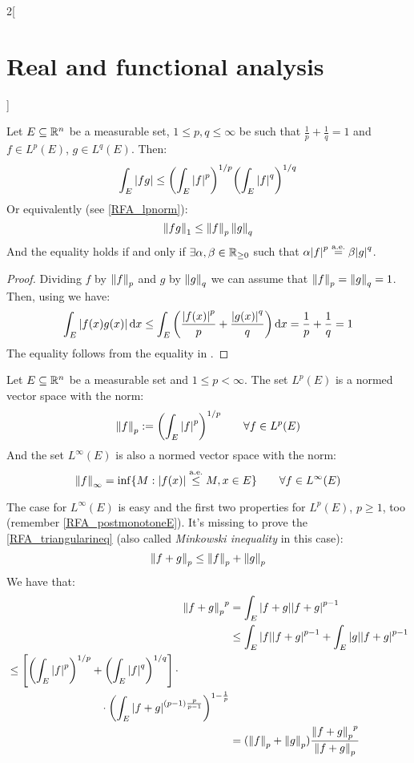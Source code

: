 \documentclass[../../../main_math.tex]{subfiles}
\begin{document}
\begin{multicols}{2}[\section{Real and functional analysis}]
\begin{sproof}
  \end{sproof}
  \begin{proposition}
    Let $E\subseteq\mathbb{R}^n$ be a measurable set, $1\leq p,q\leq \infty$ be such that $\frac{1}{p}+\frac{1}{q}=1$ and ${f}\in L^p(E)$, ${g}\in L^q(E)$. Then:
    $$\int_E\abs{fg}\leq {\left(\int_E\abs{f}^p\right)}^{1/p}{\left(\int_E\abs{f}^q\right)}^{1/q}$$
    Or equivalently (see \cref{RFA_lpnorm}):
    $$\left\|{fg}\right\|_1\leq\left\|{f}\right\|_p\left\|{g}\right\|_q$$
    And the equality holds if and only if $\exists \alpha,\beta\in\mathbb{R}_{\geq 0}$ such that $\alpha{\abs{{f}}}^p\overset{\text{a.e.}}{=}\beta{\abs{{g}}}^q$.
  \end{proposition}
  \begin{proof}
    Dividing $f$ by $\left\|f\right\|_p$ and $g$ by $\left\|g\right\|_q$ we can assume that $\left\|f\right\|_p=\left\|g\right\|_q=1$. Then, using  we have:
    $$\int_E\abs{f(x)g(x)}\dd{x}\leq\int_E\left(\frac{\abs{f(x)}^p}{p}+\frac{\abs{g(x)}^q}{q}\right)\dd{x}=\frac{1}{p}+\frac{1}{q}=1$$
    The equality follows from the equality in .
  \end{proof}
  \begin{proposition}\label{RFA_lpnorm}
    Let $E\subseteq\mathbb{R}^n$ be a measurable set and $1\leq p<\infty$. The set $L^p(E)$ is a normed vector space with the norm: $$\left\|{f}\right\|_p:={\left(\int_E\abs{{f}}^p\right)}^{1/p}\qquad\forall{f}\in L^p(E)$$
    And the set $L^\infty(E)$ is also a normed vector space with the norm: $$\left\|{f}\right\|_\infty=\inf \{M:\abs{{f}(x)}\overset{\text{a.e.}}{\leq} M, x\in E\}\qquad\forall{f}\in L^\infty(E)$$
  \end{proposition}
  \begin{sproof}
    The case for $L^\infty(E)$ is easy and the first two properties for $L^p(E)$, $p\geq 1$, too (remember \cref{RFA_postmonotoneE}). It's missing to prove the \ref{RFA_triangularineq} (also called \emph{Minkowski inequality} in this case): $$\left\|f+g\right\|_p\leq \left\|f\right\|_p+\left\|g\right\|_p$$
    We have that:
    \begin{align*}
      {\norm{f+g}_p}^p & =\int_E\abs{f+g}\abs{f+g}^{p-1}                                            \\
                       & \leq \int_E\abs{f}\abs{f+g}^{p-1}+\int_E\abs{g}\abs{f+g}^{p-1}             \\
      \begin{split}
        & \leq \left[{\left(\int_E\abs{f}^p\right)}^{1/p}+{\left(\int_E\abs{f}^q\right)}^{1/q}\right]\cdot \\
        &\hspace{3cm}\cdot{\left(\int_E\abs{f+g}^{(p-1)\frac{p}{p-1}}\right)}^{1-\frac{1}{p}}
      \end{split} \\
                       & =(\norm{f}_p+\norm{g}_p)\frac{{\norm{f+g}_p}^p }{{\norm{f+g}_p}}
    \end{align*}
  \end{sproof}

\end{multicols}
\end{document}
